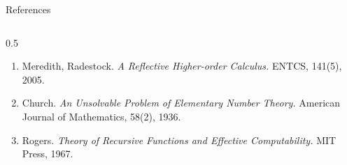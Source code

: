 \documentclass[10pt,aspectratio=169,draft]{beamer}
\begin{document}
\begin{frame}{References}
\begin{columns}[T]
\begin{column}{0.5\textwidth}
\begin{enumerate}
{          Systems: Modelling, Specification and Verification.} Cambridge
          University Press, 2007.
        \item Meredith, Radestock. \emph{A Reflective Higher-order
          Calculus.} ENTCS, 141(5), 2005.
        \item Church. \emph{An Unsolvable Problem of Elementary Number
          Theory.} American Journal of Mathematics, 58(2), 1936.
        \item Rogers. \emph{Theory of Recursive Functions and Effective
          Computability.} MIT Press, 1967.
      \end{enumerate}
    \end{column}
  \end{columns}
\end{frame}
\end{document}
